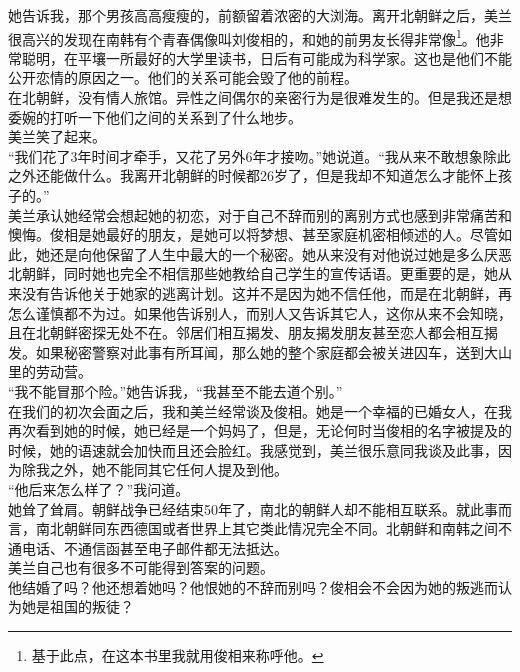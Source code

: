 \begin{multicols}{\theparacolNo}
她告诉我，那个男孩高高瘦瘦的，前额留着浓密的大浏海。离开北朝鲜之后，美兰很高兴的发现在南韩有个青春偶像叫刘俊相的，和她的前男友长得非常像\footnote{基于此点，在这本书里我就用俊相来称呼他。}。他非常聪明，在平壤一所最好的大学里读书，日后有可能成为科学家。这也是他们不能公开恋情的原因之一。他们的关系可能会毁了他的前程。\\

在北朝鲜，没有情人旅馆。异性之间偶尔的亲密行为是很难发生的。但是我还是想委婉的打听一下他们之间的关系到了什么地步。\\

美兰笑了起来。\\

“我们花了3年时间才牵手，又花了另外6年才接吻。”她说道。“我从来不敢想象除此之外还能做什么。我离开北朝鲜的时候都26岁了，但是我却不知道怎么才能怀上孩子的。”\\

美兰承认她经常会想起她的初恋，对于自己不辞而别的离别方式也感到非常痛苦和懊悔。俊相是她最好的朋友，是她可以将梦想、甚至家庭机密相倾述的人。尽管如此，她还是向他保留了人生中最大的一个秘密。她从来没有对他说过她是多么厌恶北朝鲜，同时她也完全不相信那些她教给自己学生的宣传话语。更重要的是，她从来没有告诉他关于她家的逃离计划。这并不是因为她不信任他，而是在北朝鲜，再怎么谨慎都不为过。如果他告诉别人，而别人又告诉其它人，这你从来不会知晓，且在北朝鲜密探无处不在。邻居们相互揭发、朋友揭发朋友甚至恋人都会相互揭发。如果秘密警察对此事有所耳闻，那么她的整个家庭都会被关进囚车，送到大山里的劳动营。\\

“我不能冒那个险。”她告诉我，“我甚至不能去道个别。”\\

在我们的初次会面之后，我和美兰经常谈及俊相。她是一个幸福的已婚女人，在我再次看到她的时候，她已经是一个妈妈了，但是，无论何时当俊相的名字被提及的时候，她的语速就会加快而且还会脸红。我感觉到，美兰很乐意同我谈及此事，因为除我之外，她不能同其它任何人提及到他。\\

“他后来怎么样了？”我问道。\\

她耸了耸肩。朝鲜战争已经结束50年了，南北的朝鲜人却不能相互联系。就此事而言，南北朝鲜同东西德国或者世界上其它类此情况完全不同。北朝鲜和南韩之间不通电话、不通信函甚至电子邮件都无法抵达。\\

美兰自己也有很多不可能得到答案的问题。\\

他结婚了吗？他还想着她吗？他恨她的不辞而别吗？俊相会不会因为她的叛逃而认为她是祖国的叛徒？\\


\end{multicols}
